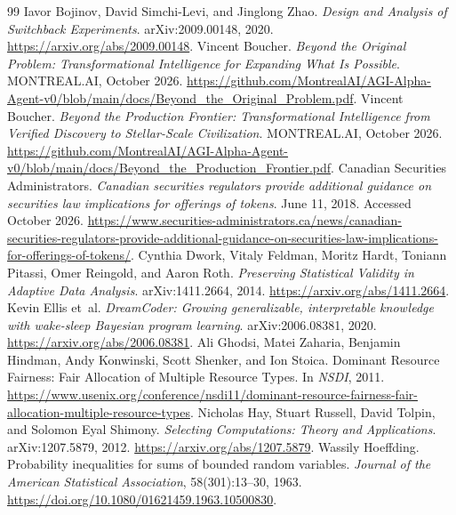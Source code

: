 \documentclass[11pt,letterpaper]{article}
\theoremstyle{remark}\newtheorem{remark}{Remark}[section]
\begin{document}
\clearpage
\begin{thebibliography}{99}
\footnotesize\setlength{\itemsep}{0pt}\setlength{\parsep}{0pt}\setlength{\parskip}{0pt}
Iavor Bojinov, David Simchi-Levi, and Jinglong Zhao. \emph{Design and Analysis of Switchback Experiments}. arXiv:2009.00148, 2020. \url{https://arxiv.org/abs/2009.00148}.
Vincent Boucher. \emph{Beyond the Original Problem: Transformational Intelligence for Expanding What Is Possible}. MONTREAL.AI, October 2026. \url{https://github.com/MontrealAI/AGI-Alpha-Agent-v0/blob/main/docs/Beyond_the_Original_Problem.pdf}.
Vincent Boucher. \emph{Beyond the Production Frontier: Transformational Intelligence from Verified Discovery to Stellar-Scale Civilization}. MONTREAL.AI, October 2026. \url{https://github.com/MontrealAI/AGI-Alpha-Agent-v0/blob/main/docs/Beyond_the_Production_Frontier.pdf}.
Canadian Securities Administrators. \emph{Canadian securities regulators provide additional guidance on securities law implications for offerings of tokens}. June 11, 2018. Accessed October 2026. \url{https://www.securities-administrators.ca/news/canadian-securities-regulators-provide-additional-guidance-on-securities-law-implications-for-offerings-of-tokens/}.
Cynthia Dwork, Vitaly Feldman, Moritz Hardt, Toniann Pitassi, Omer Reingold, and Aaron Roth. \emph{Preserving Statistical Validity in Adaptive Data Analysis}. arXiv:1411.2664, 2014. \url{https://arxiv.org/abs/1411.2664}.
Kevin Ellis et~al. \emph{DreamCoder: Growing generalizable, interpretable knowledge with wake-sleep Bayesian program learning}. arXiv:2006.08381, 2020. \url{https://arxiv.org/abs/2006.08381}.
Ali Ghodsi, Matei Zaharia, Benjamin Hindman, Andy Konwinski, Scott Shenker, and Ion Stoica. Dominant Resource Fairness: Fair Allocation of Multiple Resource Types. In \emph{NSDI}, 2011. \url{https://www.usenix.org/conference/nsdi11/dominant-resource-fairness-fair-allocation-multiple-resource-types}.
Nicholas Hay, Stuart Russell, David Tolpin, and Solomon Eyal Shimony. \emph{Selecting Computations: Theory and Applications}. arXiv:1207.5879, 2012. \url{https://arxiv.org/abs/1207.5879}.
Wassily Hoeffding. Probability inequalities for sums of bounded random variables. \emph{Journal of the American Statistical Association}, 58(301):13--30, 1963. \url{https://doi.org/10.1080/01621459.1963.10500830}.

\end{thebibliography}
\end{document}
